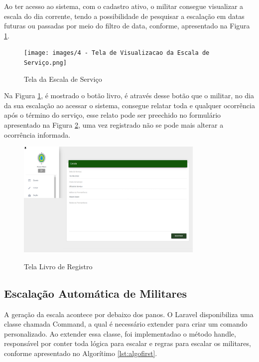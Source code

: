 Ao ter acesso ao sistema, com o cadastro ativo, o militar consegue visualizar a escala do dia corrente, tendo a possibilidade de pesquisar a escalação em datas futuras ou passadas por meio do filtro de data, conforme, apresentado na Figura \ref{fig:escalaservico}.

\begin{figure}[!htb]
    \centering
    \caption{Tela da Escala de Serviço}
    \texttt{[image: images/4 - Tela de Visualizacao da Escala de Serviço.png]}
    \label{fig:escalaservico}
\end{figure}

Na Figura \ref{fig:escalaservico}, é mostrado o botão livro, é através desse botão que o militar, no dia da sua escalação ao acessar o sistema, consegue relatar toda e qualquer ocorrência após o término do serviço, esse relato pode ser preechido no formulário apresentado na Figura \ref{fig:livroregistro}, uma vez registrado não se pode mais alterar a ocorrência informada.

\begin{figure}[!htb]
    \centering
    \caption{Tela Livro de Registro}
    \includegraphics[width=0.8\textwidth]{images/5 - Tela Livo de Registro.png}
    \label{fig:livroregistro}
\end{figure}


\subsection{Escalação Automática de Militares}

A geração da escala acontece por debaixo dos panos. O Laravel disponibiliza uma classe chamada Command, a qual é necessário extender para criar um comando personalizado. Ao extender essa classe, foi implementadao o método handle, responsável por conter toda lógica para escalar e regras para escalar os militares,  conforme apresentado no Algorítimo \ref{lst:algofirst}.

